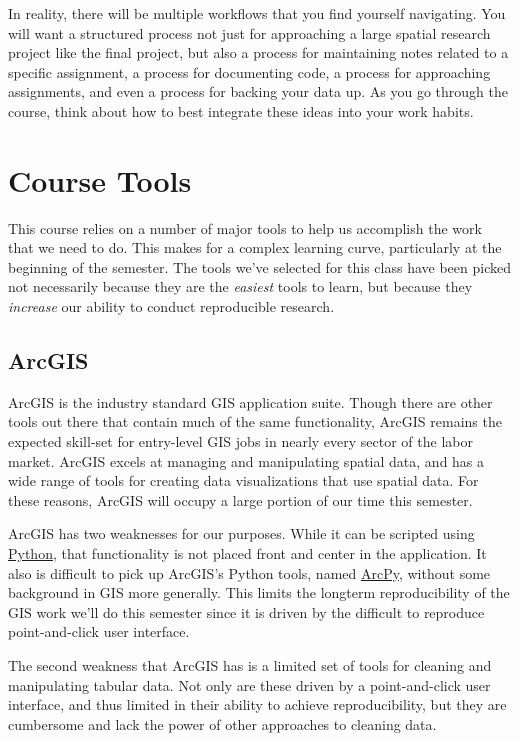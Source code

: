 \documentclass[]{book}
\begin{document}
In reality, there will be multiple workflows that you find yourself
navigating. You will want a structured process not just for approaching
a large spatial research project like the final project, but also a
process for maintaining notes related to a specific assignment, a
process for documenting code, a process for approaching assignments, and
even a process for backing your data up. As you go through the course,
think about how to best integrate these ideas into your work habits.

\section{Course Tools}\label{course-tools}

This course relies on a number of major tools to help us accomplish the
work that we need to do. This makes for a complex learning curve,
particularly at the beginning of the semester. The tools we've selected
for this class have been picked not necessarily because they are the
\emph{easiest} tools to learn, but because they \emph{increase} our
ability to conduct reproducible research.

\subsection{ArcGIS}\label{arcgis}

ArcGIS is the industry standard GIS application suite. Though there are
other tools out there that contain much of the same functionality,
ArcGIS remains the expected skill-set for entry-level GIS jobs in nearly
every sector of the labor market. ArcGIS excels at managing and
manipulating spatial data, and has a wide range of tools for creating
data visualizations that use spatial data. For these reasons, ArcGIS
will occupy a large portion of our time this semester.

ArcGIS has two weaknesses for our purposes. While it can be scripted
using \href{https://www.python.org}{Python}, that functionality is not
placed front and center in the application. It also is difficult to pick
up ArcGIS's Python tools, named
\href{http://pro.arcgis.com/en/pro-app/arcpy/get-started/what-is-arcpy-.htm}{ArcPy},
without some background in GIS more generally. This limits the longterm
reproducibility of the GIS work we'll do this semester since it is
driven by the difficult to reproduce point-and-click user interface.

The second weakness that ArcGIS has is a limited set of tools for
cleaning and manipulating tabular data. Not only are these driven by a
point-and-click user interface, and thus limited in their ability to
achieve reproducibility, but they are cumbersome and lack the power of
other approaches to cleaning data.
\end{document}
